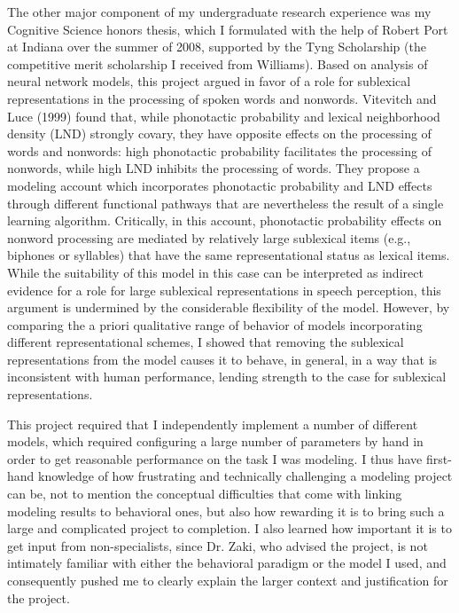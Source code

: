 \documentclass[12pt]{article}
\begin{document}
The other major component of my undergraduate research experience was my Cognitive Science honors thesis, which I formulated with the help of Robert Port at Indiana over the summer of 2008, supported by the Tyng Scholarship (the competitive merit scholarship I received from Williams).
Based on analysis of neural network models, this project argued in favor of a role for sublexical representations in the processing of spoken words and nonwords.  Vitevitch and Luce (1999) found that, while phonotactic probability and lexical neighborhood density (LND) strongly covary, they have opposite effects on the processing of words and nonwords: high phonotactic probability facilitates the processing of nonwords, while high LND inhibits the processing of words.  They propose a modeling account which incorporates phonotactic probability and LND effects through different functional pathways that are nevertheless the result of a single learning algorithm.  Critically, in this account, phonotactic probability effects on nonword processing are mediated by relatively large sublexical items (e.g., biphones or syllables) that have the same representational status as lexical items.  While the suitability of this model in this case can be interpreted as indirect evidence for a role for large sublexical representations in speech perception, this argument is undermined by the considerable flexibility of the model.  However, by comparing the a priori qualitative range of behavior of models incorporating different representational schemes, I showed that removing the sublexical representations from the model causes it to behave, in general, in a way that is inconsistent with human performance, lending strength to the case for sublexical representations.

This project required that I independently implement a number of different models, which required configuring a large number of parameters by hand in order to get reasonable performance on the task I was modeling.  I thus have first-hand knowledge of how frustrating and technically challenging a modeling project can be, not to mention the conceptual difficulties that come with linking modeling results to behavioral ones, but also how rewarding it is to bring such a large and complicated project to completion.  I also learned how important it is to get input from non-specialists, since Dr. Zaki, who advised the project, is not intimately familiar with either the behavioral paradigm or the model I used, and consequently pushed me to clearly explain the larger context and justification for the project.
\end{document}
